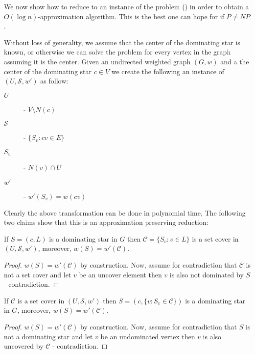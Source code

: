 We now show how to reduce \ProbStar{} to an instance of the \ProblemSetCover{} problem
(\ProbSetCover{}) in order to obtain a $O(\log n)$-approximation algorithm.
This is the best one can hope for if $P \neq NP$.

Without loss of generality, we assume that the center of the dominating star is known,
or otherwise we can solve the problem for every vertex in the graph assuming it is 
the center.  
Given an undirected weighted graph $(G, w)$ and a the center of the dominating star
$c \in V$ we create the following an instance of \ProbSetCover{} 
$(U, \mathcal{S}, w')$ as follow:
\begin{description}
\item[$U$] - $V \setminus N(c)$
\item[$\mathcal{S}$] - $\{S_v : cv \in E\}$
\item[$S_v$] - $N(v) \cap U$
\item[$w'$] - $w'(S_v) = w(cv)$ 
\end{description}
Clearly the above transformation can be done in polynomial time,
The following two claims show that this is an approximation preserving reduction:

\begin{claim}
If $S = (c, L)$ is a dominating star in $G$ then 
$\mathcal{C} = \{S_v : v \in L\}$ is a set cover in $(U, \mathcal{S}, w')$,
moreover, $w(S) = w'(\mathcal{C})$.  
\end{claim}

\begin{proof}
$w(S) = w'(\mathcal{C})$ by construction.
Now, assume for contradiction that $\mathcal{C}$ is not a set cover and let $v$
be an uncover element then $v$ is also not dominated by $S$ - contradiction.
\end{proof}

\begin{claim}
If $\mathcal{C}$ is a set cover in $(U, \mathcal{S}, w')$ 
then $S = (c, \{v : S_v \in \mathcal{C}\})$ is a dominating star in $G$,
moreover, $w(S) = w'(\mathcal{C})$.  
\end{claim}

\begin{proof}
$w(S) = w'(\mathcal{C})$ by construction.
Now, assume for contradiction that $S$ is not a dominating star and let $v$
be an undominated vertex then $v$ is also uncovered by $\mathcal{C}$ - contradiction.
\end{proof}